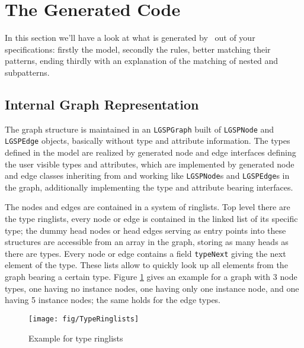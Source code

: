 \section{The Generated Code}\label{sec:generatedcode}
In this section we'll have a look at what is generated by \GrG~out of your specifications: firstly the model, secondly the rules, better matching their patterns, ending thirdly with an explanation of the matching of nested and subpatterns.

\subsection*{Internal Graph Representation}
The graph structure is maintained in an \texttt{LGSPGraph} built of \texttt{LGSPNode} and \texttt{LGSPEdge} objects, basically without type and attribute information.
The types defined in the model are realized by generated node and edge interfaces defining the user visible types and attributes, which are implemented by generated node and edge classes inheriting from and working like \texttt{LGSPNode}s and \texttt{LGSPEdge}s in the graph, additionally implementing the type and attribute bearing interfaces.

The nodes and edges are contained in a system of ringlists.
Top level there are the type ringlists, every node or edge is contained in the linked list of its specific type; the dummy head nodes or head edges serving as entry points into these structures are accessible from an array in the graph, storing as many heads as there are types.
Every node or edge contains a field \texttt{typeNext} giving the next element of the type.
These lists allow to quickly look up all elements from the graph bearing a certain type.
Figure \ref{figtyperinglists} gives an example for a graph with 3 node types, one having no instance nodes, one having only one instance node, and one having 5 instance nodes; the same holds for the edge types.

\begin{figure}[htbp]
  \centering
  \texttt{[image: fig/TypeRinglists]}
  \caption{Example for type ringlists}
  \label{figtyperinglists}
\end{figure}


